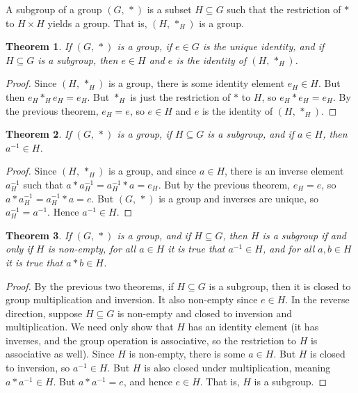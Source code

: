 \documentclass{article}
\theoremstyle{plain}
\newtheorem{theorem}{Theorem}[section]
\theoremstyle{normal}
\newenvironment{definition}{%
    \pushQED{\qed}\renewcommand{\qedsymbol}{$\blacksquare$}\definitionx%
}{%
    \popQED\enddefinitionx%
}
\begin{document}
        \begin{definition}[\textbf{Subgroup}]
            A subgroup of a group $(G,\,*)$ is a subset $H\subseteq{G}$ such
            that the restriction of $*$ to $H\times{H}$ yields a group. That
            is, $(H,\,*_{H})$ is a group.
        \end{definition}
        \begin{theorem}
            If $(G,\,*)$ is a group, if $e\in{G}$ is the unique identity, and
            if $H\subseteq{G}$ is a subgroup, then $e\in{H}$ and $e$ is the
            identity of $(H,\,*_{H})$.
        \end{theorem}
        \begin{proof}
            Since $(H,\,*_{H})$ is a group, there is some identity element
            $e_{H}\in{H}$. But then $e_{H}*_{H}e_{H}=e_{H}$. But
            $*_{H}$ is just the restriction of $*$ to $H$, so
            $e_{H}*e_{H}=e_{H}$. By the previous theorem, $e_{H}=e$, so
            $e\in{H}$ and $e$ is the identity of $(H,\,*_{H})$.
        \end{proof}
        \begin{theorem}
            If $(G,\,*)$ is a group, if $H\subseteq{G}$ is a subgroup, and
            if $a\in{H}$, then $a^{-1}\in{H}$.
        \end{theorem}
        \begin{proof}
            Since $(H,\,*_{H})$ is a group, and since $a\in{H}$, there is an
            inverse element $a_{H}^{-1}$ such that
            $a*a_{H}^{-1}=a_{H}^{-1}*a=e_{H}$. But by the previous theorem,
            $e_{H}=e$, so $a*a_{H}^{-1}=a_{H}^{-1}*a=e$. But $(G,\,*)$ is a
            group and inverses are unique, so $a_{H}^{-1}=a^{-1}$. Hence
            $a^{-1}\in{H}$.
        \end{proof}
        \begin{theorem}
            If $(G,\,*)$ is a group, and if $H\subseteq{G}$, then $H$ is a
            subgroup if and only if $H$ is non-empty, for all $a\in{H}$
            it is true that $a^{-1}\in{H}$, and for all $a,b\in{H}$ it is
            true that $a*b\in{H}$.
        \end{theorem}
        \begin{proof}
            By the previous two theorems, if $H\subseteq{G}$ is a subgroup,
            then it is closed to group multiplication and inversion. It also
            non-empty since $e\in{H}$. In the reverse direction, suppose
            $H\subseteq{G}$ is non-empty and
            closed to inversion and multiplication. We need
            only show that $H$ has an identity element (it has inverses, and
            the group operation is associative, so the restriction to $H$ is
            associative as well). Since $H$ is non-empty, there is some
            $a\in{H}$. But $H$ is closed to inversion, so $a^{-1}\in{H}$. But
            $H$ is also closed under multiplication, meaning $a*a^{-1}\in{H}$.
            But $a*a^{-1}=e$, and hence $e\in{H}$. That is, $H$ is a subgroup.
        \end{proof}
\end{document}
